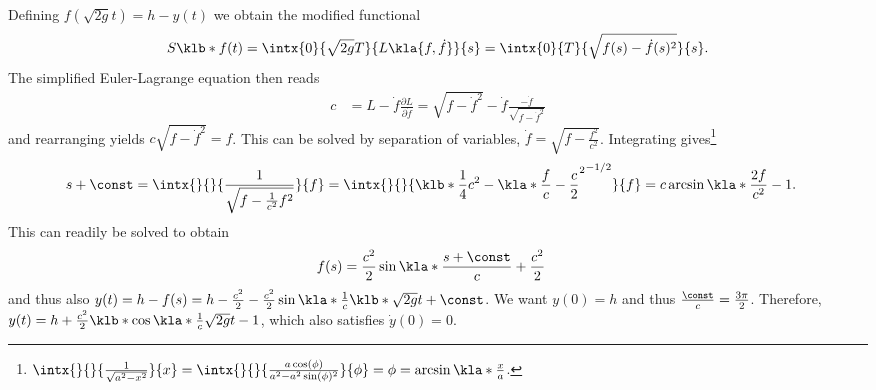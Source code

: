 \documentclass[english, parskip=full]{scrartcl}
\begin{document}
Defining $f(\sqrt{2g}t) = h - y(t)$ we obtain the modified functional
\begin{align}
S\klb*{f(t)} = \intx{0}{\sqrt{2g}T}{L\kla{f,\dot{f}}}{s} = \intx{0}{T}{\sqrt{f(s) - \dot{f}(s)^2}}{s}.
\end{align}
The simplified Euler-Lagrange equation then reads
\begin{align}
c &= L - \dot{f} \frac{\partial L}{\partial \dot{f}} = \sqrt{f - \dot{f}^2} - \dot{f} \frac{-\dot{f}}{\sqrt{f - \dot{f}^2}}
\end{align}
and rearranging yields $c\sqrt{f - \dot{f}^2} = f$.
This can be solved by separation of variables, $\dot{f} = \sqrt{f - \frac{f^2}{c^2}}$.
Integrating gives\footnote{$\intx{ }{ }{\frac{1}{\sqrt{a^2 - x^2}}}{x} = \intx{ }{ }{\frac{a\cos(\phi)}{a^2 - a^2\sin(\phi)^2}}{\phi} = \phi = \arcsin\kla*{\frac{x}{a}}$.}
\begin{align}
s+\const &= \intx{ }{ }{\frac{1}{\sqrt{f - \frac{1}{c^2}f^2}}}{f} = \intx{ }{ }{\klb*{\frac{1}{4}c^2 -\kla*{\frac{f}{c} - \frac{c}{2}}^2 }^{-1/2}}{f} = c \arcsin\kla*{\frac{2f}{c^2} - 1}.
\end{align}
This can readily be solved to obtain
\begin{align}
f(s) &= \frac{c^2}{2} \sin\kla*{\frac{s + \const}{c}} + \frac{c^2}{2}
\end{align}
and thus also $y(t) = h - f(s) = h - \frac{c^2}{2} - \frac{c^2}{2} \sin \kla*{\frac{1}{c} \klb*{\sqrt{2g}t + \const}}$.
We want $y(0)=h$ and thus $\frac{\const}{c} = \frac{3\pi}{2}$.
Therefore, $y(t) = h + \frac{c^2}{2} \klb*{\cos\kla*{\frac{1}{c}\sqrt{2g}t}-1}$, which also satisfies $\dot{y}(0)=0$.
\end{document}
